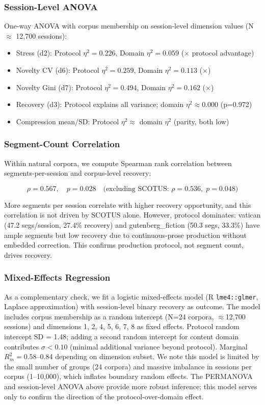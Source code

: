 \documentclass[final]{clv2025}
\begin{document}
\subsubsection{Session-Level ANOVA}

One-way ANOVA with corpus membership on session-level dimension values (N $\approx$ 12,700 sessions):

\begin{itemize}
\item Stress (d2): Protocol $\eta^2 = 0.226$, Domain $\eta^2 = 0.059$ (\anovaStressRatio$\times$ protocol advantage)
\item Novelty CV (d6): Protocol $\eta^2 = 0.259$, Domain $\eta^2 = 0.113$ (\anovaNoveltyCVRatio$\times$)
\item Novelty Gini (d7): Protocol $\eta^2 = 0.494$, Domain $\eta^2 = 0.162$ (\anovaNoveltyGiniRatio$\times$)
\item Recovery (d3): Protocol explains all variance; domain $\eta^2 \approx 0.000$ (p=0.972)
\item Compression mean/SD: Protocol $\eta^2 \approx$ domain $\eta^2$ (parity, both low)
\end{itemize}

\subsubsection{Segment-Count Correlation}

Within natural corpora, we compute Spearman rank correlation between segments-per-session and corpus-level recovery:

\[\rho = 0.567, \quad p = 0.028 \quad \text{(excluding SCOTUS: } \rho = 0.536, \; p = 0.048\text{)}\]

More segments per session correlate with higher recovery opportunity, and this correlation is not driven by SCOTUS alone. However, protocol dominates: vatican (47.2 segs/session, 27.4\% recovery) and gutenberg\_fiction (50.3 segs, 33.3\%) have ample segments but low recovery due to continuous-prose production without embedded correction. This confirms production protocol, not segment count, drives recovery.

\subsubsection{Mixed-Effects Regression}

As a complementary check, we fit a logistic mixed-effects model (R \texttt{lme4::glmer}, Laplace approximation) with session-level binary recovery as outcome. The model includes corpus membership as a random intercept (N=24 corpora, $\approx$12,700 sessions) and dimensions 1, 2, 4, 5, 6, 7, 8 as fixed effects. Protocol random intercept SD = 1.48; adding a second random intercept for content domain contributes $\sigma < 0.10$ (minimal additional variance beyond protocol). Marginal $R^2_m = 0.58$--0.84 depending on dimension subset. We note this model is limited by the small number of groups (24 corpora) and massive imbalance in sessions per corpus (1--10,000), which inflates boundary random effects. The PERMANOVA and session-level ANOVA above provide more robust inference; this model serves only to confirm the direction of the protocol-over-domain effect.
\end{document}
